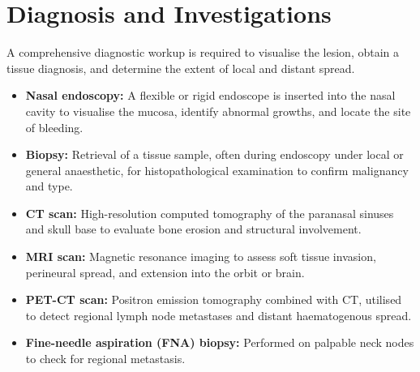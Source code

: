 \section*{Diagnosis and Investigations}
A comprehensive diagnostic workup is required to visualise the lesion, obtain a tissue diagnosis, and determine the extent of local and distant spread.
\begin{itemize}
    \item \textbf{Nasal endoscopy:} A flexible or rigid endoscope is inserted into the nasal cavity to visualise the mucosa, identify abnormal growths, and locate the site of bleeding.
    \item \textbf{Biopsy:} Retrieval of a tissue sample, often during endoscopy under local or general anaesthetic, for histopathological examination to confirm malignancy and type.
    \item \textbf{CT scan:} High-resolution computed tomography of the paranasal sinuses and skull base to evaluate bone erosion and structural involvement.
    \item \textbf{MRI scan:} Magnetic resonance imaging to assess soft tissue invasion, perineural spread, and extension into the orbit or brain.
    \item \textbf{PET-CT scan:} Positron emission tomography combined with CT, utilised to detect regional lymph node metastases and distant haematogenous spread.
    \item \textbf{Fine-needle aspiration (FNA) biopsy:} Performed on palpable neck nodes to check for regional metastasis.
\end{itemize}

